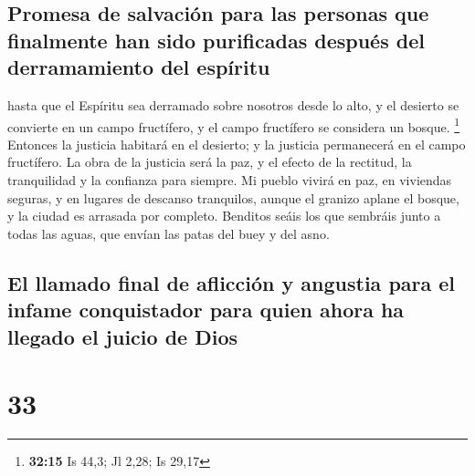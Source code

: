 \hypertarget{promesa-de-salvaciuxf3n-para-las-personas-que-finalmente-han-sido-purificadas-despuuxe9s-del-derramamiento-del-espuxedritu}{%
\subsection{Promesa de salvación para las personas que finalmente han
sido purificadas después del derramamiento del
espíritu}\label{promesa-de-salvaciuxf3n-para-las-personas-que-finalmente-han-sido-purificadas-despuuxe9s-del-derramamiento-del-espuxedritu}}

 hasta que el Espíritu sea derramado sobre nosotros desde
lo alto, y el desierto se convierte en un campo fructífero, y el campo
fructífero se considera un bosque. \footnote{\textbf{32:15} Is 44,3; Jl
  2,28; Is 29,17}  Entonces la justicia habitará en el
desierto; y la justicia permanecerá en el campo fructífero.
 La obra de la justicia será la paz, y el efecto de la
rectitud, la tranquilidad y la confianza para siempre. 
Mi pueblo vivirá en paz, en viviendas seguras, y en lugares de descanso
tranquilos,  aunque el granizo aplane el bosque, y la
ciudad es arrasada por completo.  Benditos seáis los que
sembráis junto a todas las aguas, que envían las patas del buey y del
asno.

\hypertarget{el-llamado-final-de-aflicciuxf3n-y-angustia-para-el-infame-conquistador-para-quien-ahora-ha-llegado-el-juicio-de-dios}{%
\subsection{El llamado final de aflicción y angustia para el infame
conquistador para quien ahora ha llegado el juicio de
Dios}\label{el-llamado-final-de-aflicciuxf3n-y-angustia-para-el-infame-conquistador-para-quien-ahora-ha-llegado-el-juicio-de-dios}}

\hypertarget{section-32}{%
\section{33}\label{section-32}}

